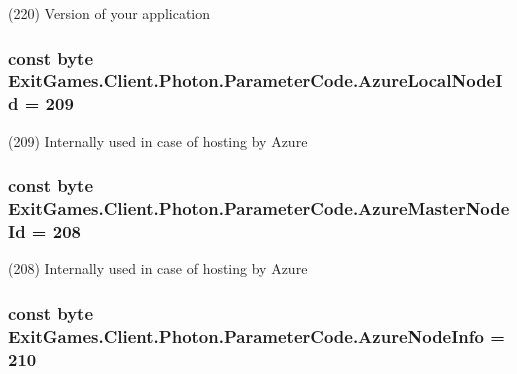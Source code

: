 (220) Version of your application

\subsubsection[{\texorpdfstring{Azure\+Local\+Node\+Id}{AzureLocalNodeId}}]{\setlength{\rightskip}{0pt plus 5cm}const byte Exit\+Games.\+Client.\+Photon.\+Parameter\+Code.\+Azure\+Local\+Node\+Id = 209}\hypertarget{class_exit_games_1_1_client_1_1_photon_1_1_parameter_code_aa32eb38e508a98688fbd6345be0d20eb}{}\label{class_exit_games_1_1_client_1_1_photon_1_1_parameter_code_aa32eb38e508a98688fbd6345be0d20eb}


(209) Internally used in case of hosting by Azure

\subsubsection[{\texorpdfstring{Azure\+Master\+Node\+Id}{AzureMasterNodeId}}]{\setlength{\rightskip}{0pt plus 5cm}const byte Exit\+Games.\+Client.\+Photon.\+Parameter\+Code.\+Azure\+Master\+Node\+Id = 208}\hypertarget{class_exit_games_1_1_client_1_1_photon_1_1_parameter_code_a20bf98696dfb8802ccd199adfeb62978}{}\label{class_exit_games_1_1_client_1_1_photon_1_1_parameter_code_a20bf98696dfb8802ccd199adfeb62978}


(208) Internally used in case of hosting by Azure

\subsubsection[{\texorpdfstring{Azure\+Node\+Info}{AzureNodeInfo}}]{\setlength{\rightskip}{0pt plus 5cm}const byte Exit\+Games.\+Client.\+Photon.\+Parameter\+Code.\+Azure\+Node\+Info = 210}\hypertarget{class_exit_games_1_1_client_1_1_photon_1_1_parameter_code_a3a10ea7f7cb16b61743291cd3c19300a}{}\label{class_exit_games_1_1_client_1_1_photon_1_1_parameter_code_a3a10ea7f7cb16b61743291cd3c19300a}


